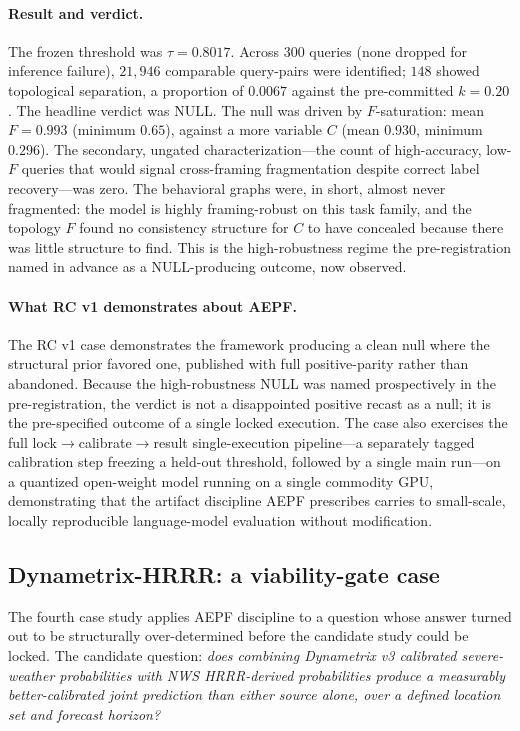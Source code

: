 \documentclass[11pt]{article}
\begin{document}
\paragraph{Result and verdict.}
The frozen threshold was $\tau = 0.8017$. Across 300 queries (none
dropped for inference failure), $21{,}946$ comparable query-pairs
were identified; $148$ showed topological separation, a proportion
of $0.0067$ against the pre-committed $k = 0.20$. The headline
verdict was NULL. The null was driven by $F$-saturation: mean
$F = 0.993$ (minimum $0.65$), against a more variable $C$
(mean $0.930$, minimum $0.296$). The secondary, ungated
characterization---the count of high-accuracy, low-$F$ queries that
would signal cross-framing fragmentation despite correct label
recovery---was zero. The behavioral graphs were, in short, almost
never fragmented: the model is highly framing-robust on this task
family, and the topology $F$ found no consistency structure for $C$
to have concealed because there was little structure to find. This
is the high-robustness regime the pre-registration named in advance
as a NULL-producing outcome, now observed.

\paragraph{What RC v1 demonstrates about AEPF.}
The RC v1 case demonstrates the framework producing a clean null
where the structural prior favored one, published with full
positive-parity rather than abandoned. Because the high-robustness
NULL was named prospectively in the pre-registration, the verdict is
not a disappointed positive recast as a null; it is the
pre-specified outcome of a single locked execution. The case also
exercises the full lock${\rightarrow}$calibrate${\rightarrow}$result
single-execution pipeline---a separately tagged calibration step
freezing a held-out threshold, followed by a single main run---on a
quantized open-weight model running on a single commodity GPU,
demonstrating that the artifact discipline AEPF prescribes carries
to small-scale, locally reproducible language-model evaluation
without modification.

\subsection{Dynametrix-HRRR: a viability-gate case}
\label{subsec:dynametrix-hrrr-case}

The fourth case study applies AEPF discipline to a question whose
answer turned out to be structurally over-determined before the
candidate study could be locked. The candidate question:
\emph{does combining Dynametrix v3 calibrated severe-weather
probabilities with NWS HRRR-derived probabilities produce a
measurably better-calibrated joint prediction than either source
alone, over a defined location set and forecast horizon?}
\end{document}
